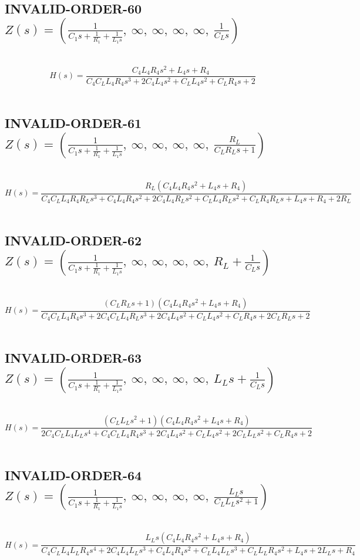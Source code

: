 \documentclass{article}
\begin{document}
\subsection{INVALID-ORDER-60 $Z(s) = \left( \frac{1}{C_{1} s + \frac{1}{R_{1}} + \frac{1}{L_{1} s}}, \  \infty, \  \infty, \  \infty, \  \infty, \  \frac{1}{C_{L} s}\right)$ } \ 
\textbf{\[H(s) = \frac{C_{4} L_{4} R_{4} s^{2} + L_{4} s + R_{4}}{C_{4} C_{L} L_{4} R_{4} s^{3} + 2 C_{4} L_{4} s^{2} + C_{L} L_{4} s^{2} + C_{L} R_{4} s + 2}\] } \ 
\subsection{INVALID-ORDER-61 $Z(s) = \left( \frac{1}{C_{1} s + \frac{1}{R_{1}} + \frac{1}{L_{1} s}}, \  \infty, \  \infty, \  \infty, \  \infty, \  \frac{R_{L}}{C_{L} R_{L} s + 1}\right)$ } \ 
\textbf{\[H(s) = \frac{R_{L} \left(C_{4} L_{4} R_{4} s^{2} + L_{4} s + R_{4}\right)}{C_{4} C_{L} L_{4} R_{4} R_{L} s^{3} + C_{4} L_{4} R_{4} s^{2} + 2 C_{4} L_{4} R_{L} s^{2} + C_{L} L_{4} R_{L} s^{2} + C_{L} R_{4} R_{L} s + L_{4} s + R_{4} + 2 R_{L}}\] } \ 
\subsection{INVALID-ORDER-62 $Z(s) = \left( \frac{1}{C_{1} s + \frac{1}{R_{1}} + \frac{1}{L_{1} s}}, \  \infty, \  \infty, \  \infty, \  \infty, \  R_{L} + \frac{1}{C_{L} s}\right)$ } \ 
\textbf{\[H(s) = \frac{\left(C_{L} R_{L} s + 1\right) \left(C_{4} L_{4} R_{4} s^{2} + L_{4} s + R_{4}\right)}{C_{4} C_{L} L_{4} R_{4} s^{3} + 2 C_{4} C_{L} L_{4} R_{L} s^{3} + 2 C_{4} L_{4} s^{2} + C_{L} L_{4} s^{2} + C_{L} R_{4} s + 2 C_{L} R_{L} s + 2}\] } \ 
\subsection{INVALID-ORDER-63 $Z(s) = \left( \frac{1}{C_{1} s + \frac{1}{R_{1}} + \frac{1}{L_{1} s}}, \  \infty, \  \infty, \  \infty, \  \infty, \  L_{L} s + \frac{1}{C_{L} s}\right)$ } \ 
\textbf{\[H(s) = \frac{\left(C_{L} L_{L} s^{2} + 1\right) \left(C_{4} L_{4} R_{4} s^{2} + L_{4} s + R_{4}\right)}{2 C_{4} C_{L} L_{4} L_{L} s^{4} + C_{4} C_{L} L_{4} R_{4} s^{3} + 2 C_{4} L_{4} s^{2} + C_{L} L_{4} s^{2} + 2 C_{L} L_{L} s^{2} + C_{L} R_{4} s + 2}\] } \ 
\subsection{INVALID-ORDER-64 $Z(s) = \left( \frac{1}{C_{1} s + \frac{1}{R_{1}} + \frac{1}{L_{1} s}}, \  \infty, \  \infty, \  \infty, \  \infty, \  \frac{L_{L} s}{C_{L} L_{L} s^{2} + 1}\right)$ } \ 
\textbf{\[H(s) = \frac{L_{L} s \left(C_{4} L_{4} R_{4} s^{2} + L_{4} s + R_{4}\right)}{C_{4} C_{L} L_{4} L_{L} R_{4} s^{4} + 2 C_{4} L_{4} L_{L} s^{3} + C_{4} L_{4} R_{4} s^{2} + C_{L} L_{4} L_{L} s^{3} + C_{L} L_{L} R_{4} s^{2} + L_{4} s + 2 L_{L} s + R_{4}}\] } \ 
\end{document}
